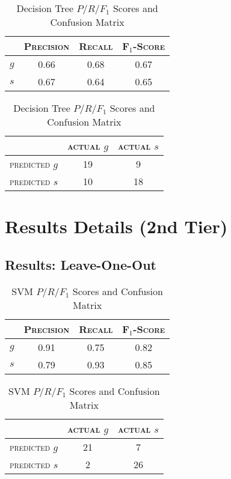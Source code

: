 \begin{table}[ht]
\begin{minipage}[b]{0.45\linewidth}\centering
\begin{tabular}{ c | c  c  c }
	& \textsc{Precision} & \textsc{Recall} & \textsc{F$_1$-Score} \\
	\hline
	\textsc{$g$} 	& 0.66 & 0.68 & 0.67 \\
	\textsc{$s$}	& 0.67 & 0.64 & 0.65
\end{tabular}
\end{minipage}
\hspace{0.5cm}
\begin{minipage}[b]{0.45\linewidth}
\centering
\begin{tabular}{ c | c  c }
	 & \textsc{actual $g$} & \textsc{actual $s$} \\
	\hline
	\textsc{predicted $g$} 	& 19 & 9 \\
	\textsc{predicted $s$}		& 10 & 18
\end{tabular}
\end{minipage}
\caption{Decision Tree $P/R/F_1$ Scores and Confusion Matrix}
\end{table}



\chapter{Results Details (2nd Tier)}
\section{Results: Leave-One-Out}
\begin{table}[ht]
\begin{minipage}[b]{0.45\linewidth}\centering
\begin{tabular}{ c | c  c  c }
	& \textsc{Precision} & \textsc{Recall} & \textsc{F$_1$-Score} \\
	\hline
	\textsc{$g$} 	& 0.91 & 0.75 & 0.82 \\
	\textsc{$s$}	& 0.79 & 0.93 & 0.85
\end{tabular}
\end{minipage}
\hspace{0.5cm}
\begin{minipage}[b]{0.45\linewidth}
\centering
\begin{tabular}{ c | c  c }
	 & \textsc{actual $g$} & \textsc{actual $s$} \\
	\hline
	\textsc{predicted $g$} 	& 21 & 7 \\
	\textsc{predicted $s$}		& 2 & 26
\end{tabular}
\end{minipage}
\caption{SVM $P/R/F_1$ Scores and Confusion Matrix}
\end{table}

